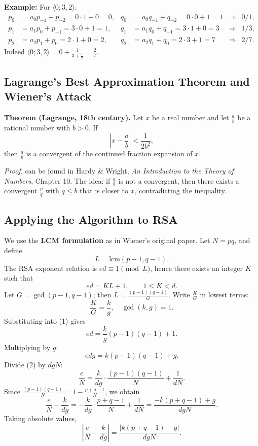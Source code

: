 \textbf{Example:} For \(\langle 0;3,2\rangle\):
\begin{align*}
p_0 &= a_0 p_{-1}+p_{-2}=0\cdot1+0=0, & q_0 &= a_0 q_{-1}+q_{-2}=0\cdot0+1=1 &\Rightarrow& 0/1,\\
p_1 &= a_1 p_0+p_{-1}=3\cdot0+1=1, & q_1 &= a_1 q_0+q_{-1}=3\cdot1+0=3 &\Rightarrow& 1/3,\\
p_2 &= a_2 p_1+p_0=2\cdot1+0=2, & q_2 &= a_2 q_1+q_0=2\cdot3+1=7 &\Rightarrow& 2/7.
\end{align*}
Indeed \(\langle 0;3,2\rangle = 0+\frac{1}{3+\frac12}= \frac{2}{7}\).


\subsection*{Lagrange's Best Approximation Theorem and Wiener's Attack}

\textbf{Theorem (Lagrange, 18th century).}  
Let \(x\) be a real number and let \(\frac{a}{b}\) be a rational number with \(b>0\). If
\[
\left| x - \frac{a}{b} \right| < \frac{1}{2b^2},
\]
then \(\frac{a}{b}\) is a convergent of the continued fraction expansion of \(x\).

\emph{Proof.}  can be found in  Hardy \& Wright, \textit{An Introduction to the Theory of Numbers}, Chapter 10. The idea: if \(\frac{a}{b}\) is not a convergent, then there exists a convergent \(\frac{p}{q}\) with \(q \le b\) that is closer to \(x\), contradicting the inequality. 

\subsection{Applying the Algorithm to RSA }

We use the \textbf{LCM formulation} as in Wiener's original paper. Let \(N=pq\), and define
\[
L = \mathrm{lcm}(p-1,q-1).
\]
The RSA exponent relation is \(e d \equiv 1 \pmod{L}\), hence there exists an integer \(K\) such that
\[
e d = K L + 1, \qquad 1 \le K < d. \tag{1}
\]
Let \(G = \gcd(p-1,q-1)\); then \(L = \frac{(p-1)(q-1)}{G}\). Write \(\frac{K}{G}\) in lowest terms:
\[
\frac{K}{G} = \frac{k}{g}, \quad \gcd(k,g)=1.
\]
Substituting into (1) gives
\[
e d = \frac{k}{g} (p-1)(q-1) + 1.
\]
Multiplying by \(g\):
\[
e d g = k (p-1)(q-1) + g. \tag{2}
\]
Divide (2) by \(d g N\):
\[
\frac{e}{N} = \frac{k}{d g} \cdot \frac{(p-1)(q-1)}{N} + \frac{1}{d N}.
\]
Since \(\frac{(p-1)(q-1)}{N} = 1 - \frac{p+q-1}{N}\), we obtain
\[
\frac{e}{N} - \frac{k}{d g} = -\frac{k}{d g} \cdot \frac{p+q-1}{N} + \frac{1}{d N}
= \frac{-k(p+q-1) + g}{d g N}.
\]
Taking absolute values,
\[
\left| \frac{e}{N} - \frac{k}{d g} \right| = \frac{|k(p+q-1) - g|}{d g N}. \tag{3}
\]


